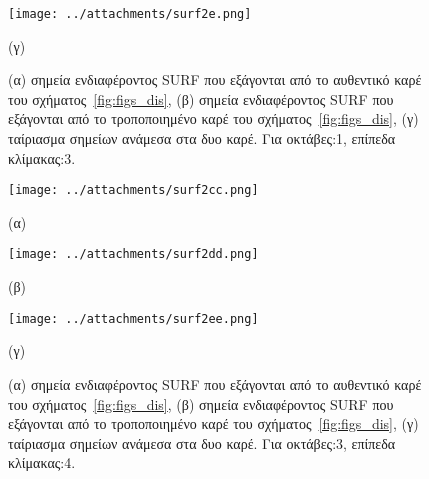 \begin{figure}[!h]
\begin{minipage}[b]{1.0\linewidth}

 \centering
\texttt{[image: ../attachments/surf2e.png]}
\caption*{(γ)}
\label{fig:surf_9}
\end{minipage}
\caption{(α) σημεία ενδιαφέροντος SURF που εξάγονται από το αυθεντικό καρέ του σχήματος~\ref{fig:figs_dis},
(β) σημεία ενδιαφέροντος SURF που εξάγονται από το τροποποιημένο καρέ του σχήματος~\ref{fig:figs_dis},
(γ) ταίριασμα σημείων ανάμεσα στα δυο καρέ. Για οκτάβες:1, επίπεδα κλίμακας:3.}
\label{fig:surf_dis_1}
\end{figure}



\newpage

 
\begin{figure}[!ht]
\begin{minipage}[b]{0.4\linewidth}
\centering
\texttt{[image: ../attachments/surf2cc.png]}
\caption*{(α)}
\label{fig:surf_10}
\end{minipage}
\hspace{0.9cm}
\begin{minipage}[b]{0.7\linewidth}
\centering
\texttt{[image: ../attachments/surf2dd.png]}
\caption*{(β)}
\label{fig:surf_11}
\end{minipage}
\end{figure}

 \begin{figure}[!h]
\begin{minipage}[b]{1.0\linewidth}
 \centering
\texttt{[image: ../attachments/surf2ee.png]}
\caption*{(γ)}
\label{fig:surf_12}
\end{minipage}
\caption{(α) σημεία ενδιαφέροντος SURF που εξάγονται από το αυθεντικό καρέ του σχήματος~\ref{fig:figs_dis},
(β) σημεία ενδιαφέροντος SURF που εξάγονται από το τροποποιημένο καρέ του σχήματος~\ref{fig:figs_dis},
(γ) ταίριασμα σημείων ανάμεσα στα δυο καρέ. Για οκτάβες:3, επίπεδα κλίμακας:4.}
\label{fig:surf_dis_2}
\end{figure}

